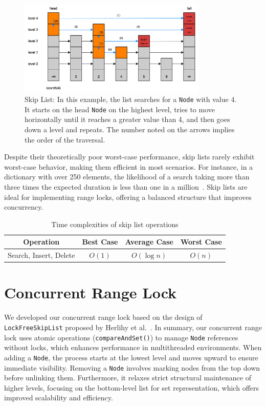 \begin{figure}[h]
    \centering
    \includegraphics[width=0.8\textwidth]{./figures/skiplistsearch}
    \caption{Skip List: In this example, the list searches for a \texttt{Node} with value 4. It starts on the head \texttt{Node} on the highest level, tries to move horizontally until it reaches a greater value than 4, and then goes down a level and repeats. The number noted on the arrows implies the order of the traversal.}
    \label{fig:skiplistsearch}
\end{figure}

Despite their theoretically poor worst-case performance, skip lists rarely exhibit worst-case behavior, making them efficient in most scenarios.
For instance, in a dictionary with over 250 elements, the likelihood of a search taking more than three times the expected duration is less than one in a million~\parencite{pugh1990skip2}.
Skip lists are ideal for implementing range locks, offering a balanced structure that improves concurrency.

\begin{table}[h!]
    \centering
    \begin{tabular}{|c|c|c|c|}
        \hline
        \textbf{Operation} & \textbf{Best Case} & \textbf{Average Case} & \textbf{Worst Case} \\ \hline
 Search, Insert, Delete & $O(1)$ & $O(\log n)$ & $O(n)$ \\ \hline
    \end{tabular}
    \caption{Time complexities of skip list operations}
    \label{tab:skiplisttimecomplexity}
\end{table}

\newpage

\section{Concurrent Range Lock}\label{sec:concurrent-range-lock}
We developed our concurrent range lock based on the design of \texttt{LockFreeSkipList} proposed by Herlihy et al.~\parencite{herlihy2020art}.
In summary, our concurrent range lock uses atomic operations (\texttt{compareAndSet()}) to manage \texttt{Node} references without locks, which enhances performance in multithreaded environments.
When adding a \texttt{Node}, the process starts at the lowest level and moves upward to ensure immediate visibility.
Removing a \texttt{Node} involves marking nodes from the top down before unlinking them.
Furthermore, it relaxes strict structural maintenance of higher levels, focusing on the bottom-level list for set representation, which offers improved scalability and efficiency.

